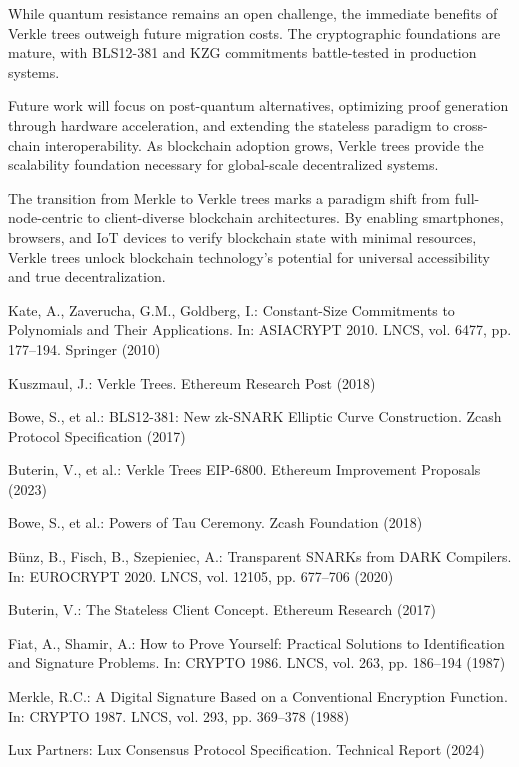 \documentclass[11pt,a4paper]{article}
\theoremstyle{definition}
\begin{document}
While quantum resistance remains an open challenge, the immediate benefits of Verkle trees outweigh future migration costs. The cryptographic foundations are mature, with BLS12-381 and KZG commitments battle-tested in production systems.

Future work will focus on post-quantum alternatives, optimizing proof generation through hardware acceleration, and extending the stateless paradigm to cross-chain interoperability. As blockchain adoption grows, Verkle trees provide the scalability foundation necessary for global-scale decentralized systems.

The transition from Merkle to Verkle trees marks a paradigm shift from full-node-centric to client-diverse blockchain architectures. By enabling smartphones, browsers, and IoT devices to verify blockchain state with minimal resources, Verkle trees unlock blockchain technology's potential for universal accessibility and true decentralization.


\begin{thebibliography}{99}

Kate, A., Zaverucha, G.M., Goldberg, I.: Constant-Size Commitments to Polynomials and Their Applications. In: ASIACRYPT 2010. LNCS, vol. 6477, pp. 177–194. Springer (2010)

Kuszmaul, J.: Verkle Trees. Ethereum Research Post (2018)

Bowe, S., et al.: BLS12-381: New zk-SNARK Elliptic Curve Construction. Zcash Protocol Specification (2017)

Buterin, V., et al.: Verkle Trees EIP-6800. Ethereum Improvement Proposals (2023)

Bowe, S., et al.: Powers of Tau Ceremony. Zcash Foundation (2018)

Bünz, B., Fisch, B., Szepieniec, A.: Transparent SNARKs from DARK Compilers. In: EUROCRYPT 2020. LNCS, vol. 12105, pp. 677–706 (2020)

Buterin, V.: The Stateless Client Concept. Ethereum Research (2017)

Fiat, A., Shamir, A.: How to Prove Yourself: Practical Solutions to Identification and Signature Problems. In: CRYPTO 1986. LNCS, vol. 263, pp. 186–194 (1987)

Merkle, R.C.: A Digital Signature Based on a Conventional Encryption Function. In: CRYPTO 1987. LNCS, vol. 293, pp. 369–378 (1988)

Lux Partners: Lux Consensus Protocol Specification. Technical Report (2024)

\end{thebibliography}
\end{document}
